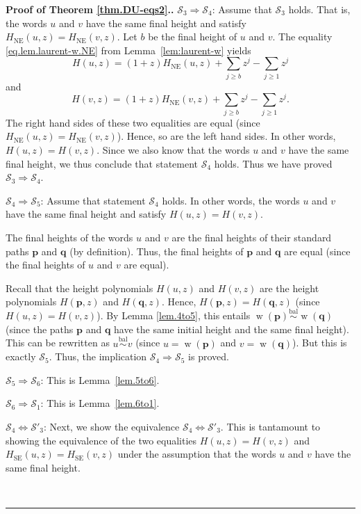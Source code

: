 \documentclass[numbers=enddot,12pt,final,onecolumn,notitlepage]{scrartcl}%
\theoremstyle{definition}
\newenvironment{proof}[1][Proof]{\noindent\textbf{#1.} }{\ \rule{0.5em}{0.5em}}
\newcommand{\pp}{\mathbf{p}}
\newcommand{\qq}{\mathbf{q}}
\newcommand{\SE}{\operatorname{SE}}
\newcommand{\NE}{\operatorname{NE}}
\newcommand{\w}{\operatorname{w}}
\newcommand{\balsim}{\overset{\operatorname*{bal}}{\sim}}
\newcommand{\tup}[1]{\left( #1 \right)}
\begin{document}
\begin{proof}[Proof of Theorem \ref{thm.DU-eqs2}.]
$\mathcal{S}_{3}\Longrightarrow\mathcal{S}_{4}$: Assume that $\mathcal{S}_3$ holds.
That is, the words $u$ and $v$ have the same final
height and satisfy $H_{\NE}\left(  u,z\right)
=H_{\NE}\left(  v,z\right)  $. Let $b$ be the final height of $u$ and $v$.
The equality \eqref{eq.lem.laurent-w.NE} from Lemma~\ref{lem:laurent-w} yields
\[
H(u,z) = (1+z)H_{\NE}(u,z) + \sum_{j \geq b} z^j - \sum_{j \geq 1} z^j
\]
and
\[
H(v,z) = (1+z)H_{\NE}(v,z) + \sum_{j \geq b} z^j - \sum_{j \geq 1} z^j .
\]
The right hand sides of these two equalities are equal (since $H_{\NE}\left(  u,z\right)
=H_{\NE}\left(  v,z\right)  $). Hence, so are the left hand sides.
In other words, $H\tup{u, z} = H\tup{v, z}$.
Since we also know that the words $u$ and $v$ have the same final
height, we thus conclude that statement $\mathcal{S}_4$ holds.
Thus we have proved $\mathcal{S}_{3}\Longrightarrow\mathcal{S}_{4}$.
\medskip

$\mathcal{S}_{4}\Longrightarrow\mathcal{S}_{5}$:
Assume that statement $\mathcal{S}_4$ holds.
In other words, the words $u$ and $v$ have the same final
height and satisfy $H\tup{u, z} = H\tup{v, z}$.

The final heights of the words $u$ and $v$ are the final heights of their standard paths $\pp$ and $\qq$ (by definition).
Thus, the final heights of $\pp$ and $\qq$ are equal (since the final heights of $u$ and $v$ are equal).

Recall that the height polynomials $H\tup{u,z}$ and $H\tup{v,z}$ are
the height polynomials $H\left(  \pp,z\right)  $ and
$H\left(  \qq,z\right)  $.
Hence, $H\tup{\pp, z} = H\tup{\qq, z}$
(since $H\tup{u, z} = H\tup{v, z}$).
By Lemma \ref{lem.4to5}, this entails $\w\tup{\pp} \balsim \w\tup{\qq}$
(since the paths $\pp$ and $\qq$ have the same initial height and the same final height).
This can be rewritten as $u \balsim v$ (since $u = \w\tup{\pp}$ and $v = \w\tup{\qq}$).
But this is exactly $\mathcal{S}_5$.
Thus, the implication $\mathcal{S}_4 \Longrightarrow \mathcal{S}_5$ is proved.
\medskip


$\mathcal{S}_{5}\Longrightarrow \mathcal{S}_{6}$: This is Lemma~\ref{lem.5to6}.
\medskip

$\mathcal{S}_{6}\Longrightarrow \mathcal{S}_{1}$: This is Lemma~\ref{lem.6to1}.
\medskip

$\mathcal{S}_4 \Longleftrightarrow \mathcal{S}'_3$:
Next, we show the equivalence
$\mathcal{S}_4 \Longleftrightarrow \mathcal{S}'_3$.
This is tantamount to showing the equivalence of the two
equalities $H\tup{u, z} = H\tup{v, z}$
and $H_{\SE} \tup{u, z} = H_{\SE} \tup{v, z}$
under the assumption that the words $u$ and $v$ have the same final height.


\end{proof}
\end{document}
